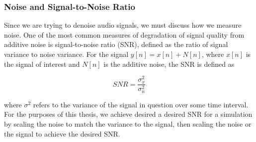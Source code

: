 \subsubsection{Noise and Signal-to-Noise Ratio}
Since we are trying to denoise audio signals, we must discuss how we measure noise. One of the most common measures of degradation of signal quality from additive noise is signal-to-noise ratio (SNR), defined as the ratio of signal variance to noise variance. \cite{alan1989discrete} For the signal $y[n] = x[n] + N[n]$, where $x[n]$ is the signal of interest and $N[n]$ is the additive noise, the SNR is defined as

\begin{equation}
SNR = \dfrac{\sigma_{x}^2}{\sigma_{n}^2}
\end{equation}

where $\sigma^{2}$ refers to the variance of the signal in question over some time interval. For the purposes of this thesis, we achieve desired a desired SNR for a simulation by scaling the noise to match the variance to the signal, then scaling the noise or the signal to achieve the desired SNR. %

